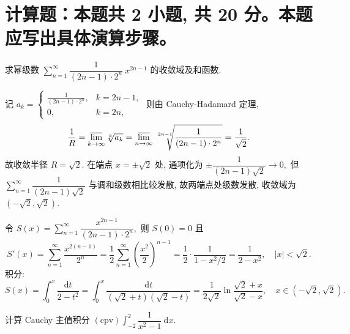 \showquestionpoints

\section{计算题：本题共 2 小题, 共 20 分。本题应写出具体演算步骤。}


\begin{question}[points = 10]
求幂级数 $\displaystyle\sum_{n=1}^\infty \dfrac{1}{(2n-1) \cdot 2^n} ~ x^{2n-1}$ 的收敛域及和函数.

\end{question}

\begin{solution}
记 $a_k = \begin{cases}
\frac{1}{(2n-1) \cdot 2^n}, & k = 2n-1, \\ 0, & k = 2n,
\end{cases}$ 则由 Cauchy-Hadamard 定理,
\[
\frac{1}{R} = \varlimsup_{k\to\infty} \sqrt[k]{a_k} = \varlimsup_{n\to\infty} \nroot[2n-1]{\frac{1}{(2n-1) \cdot 2^n}} = \frac{1}{\sqrt{2}}.
\]
故收敛半径 $R = \sqrt{2}.$ 在端点 $x = \pm\sqrt{2}$ 处, 通项化为 $\pm\dfrac{1}{(2n-1)\sqrt{2}} \to 0,$ 但 $\displaystyle\sum_{n=1}^\infty \dfrac{1}{(2n-1)\sqrt{2}}$ 与调和级数相比较发散, 故两端点处级数发散, 收敛域为 $(-\sqrt{2}, \sqrt{2}).$

令 $S(x) = \displaystyle\sum_{n=1}^\infty \dfrac{x^{2n-1}}{(2n-1) \cdot 2^n},$ 则 $S(0) = 0$ 且
\begin{equation*}
S'(x) = \sum_{n=1}^\infty \frac{x^{2(n-1)}}{2^n} = \frac{1}{2} \sum_{n=1}^\infty \left( \frac{x^2}{2} \right)^{n-1} = \frac{1}{2} \cdot \frac{1}{1 - x^2/2} = \frac{1}{2 - x^2}, \quad |x| < \sqrt{2}.
\end{equation*}
积分:
\begin{equation*}
S(x) = \int_0^x \frac{\mathrm{d}t}{2 - t^2} = \int_0^x \frac{\mathrm{d}t}{(\sqrt{2} + t)(\sqrt{2} - t)} = \frac{1}{2\sqrt{2}} \ln \frac{\sqrt{2} + x}{\sqrt{2} - x}, \quad x \in (-\sqrt{2}, \sqrt{2}).
\end{equation*}
\end{solution}


\begin{question}[points = 10]
计算 Cauchy 主值积分 $\displaystyle (\text{cpv}) \int_{-2}^2 \dfrac{1}{x^2 - 1} ~ \mathrm{d}x.$

\end{question}

